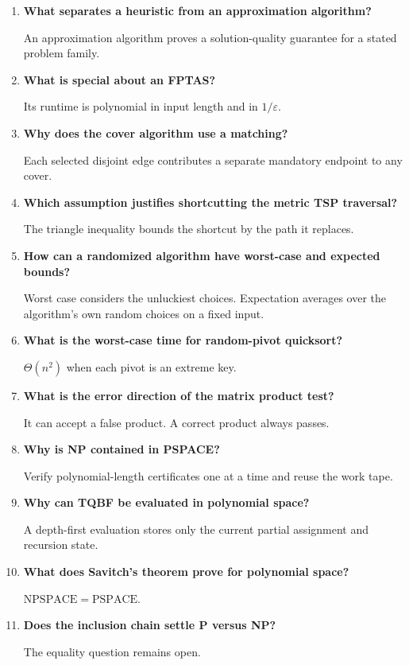 \documentclass[12pt,a4paper]{article}
\newcommand{\Q}[1]{\textbf{#1}\par\noindent\ignorespaces}
\begin{document}
\begin{tcolorbox}[exambox, title={Frequently Asked / Viva Questions}]
\begin{enumerate}[topsep=0pt, label=\textbf{Q\arabic*.}, itemsep=5pt, leftmargin=*]
  \item \Q{What separates a heuristic from an approximation algorithm?}
    An approximation algorithm proves a solution-quality guarantee for a stated problem family.
  \item \Q{What is special about an FPTAS?}
    Its runtime is polynomial in input length and in $1/\varepsilon$.
  \item \Q{Why does the cover algorithm use a matching?}
    Each selected disjoint edge contributes a separate mandatory endpoint to any cover.
  \item \Q{Which assumption justifies shortcutting the metric TSP traversal?}
    The triangle inequality bounds the shortcut by the path it replaces.
  \item \Q{How can a randomized algorithm have worst-case and expected bounds?}
    Worst case considers the unluckiest choices. Expectation averages over the algorithm's own random choices on a fixed input.
  \item \Q{What is the worst-case time for random-pivot quicksort?}
    $\Theta(n^2)$ when each pivot is an extreme key.
  \item \Q{What is the error direction of the matrix product test?}
    It can accept a false product. A correct product always passes.
  \item \Q{Why is NP contained in PSPACE?}
    Verify polynomial-length certificates one at a time and reuse the work tape.
  \item \Q{Why can TQBF be evaluated in polynomial space?}
    A depth-first evaluation stores only the current partial assignment and recursion state.
  \item \Q{What does Savitch's theorem prove for polynomial space?}
    $\mathrm{NPSPACE}=\mathrm{PSPACE}$.
  \item \Q{Does the inclusion chain settle P versus NP?}
    The equality question remains open.
\end{enumerate}
\end{tcolorbox}
\end{document}

